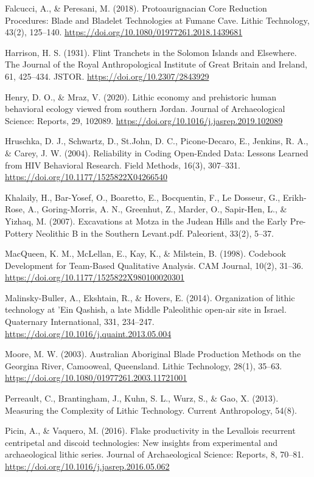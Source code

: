 \documentclass[
]{article}
\begin{document}
Falcucci, A., \& Peresani, M. (2018). Protoaurignacian Core Reduction
Procedures: Blade and Bladelet Technologies at Fumane Cave. Lithic
Technology, 43(2), 125--140.
\url{https://doi.org/10.1080/01977261.2018.1439681}

Harrison, H. S. (1931). Flint Tranchets in the Solomon Islands and
Elsewhere. The Journal of the Royal Anthropological Institute of Great
Britain and Ireland, 61, 425--434. JSTOR.
\url{https://doi.org/10.2307/2843929}

Henry, D. O., \& Mraz, V. (2020). Lithic economy and prehistoric human
behavioral ecology viewed from southern Jordan. Journal of
Archaeological Science: Reports, 29, 102089.
\url{https://doi.org/10.1016/j.jasrep.2019.102089}

Hruschka, D. J., Schwartz, D., St.John, D. C., Picone-Decaro, E.,
Jenkins, R. A., \& Carey, J. W. (2004). Reliability in Coding Open-Ended
Data: Lessons Learned from HIV Behavioral Research. Field Methods,
16(3), 307--331. \url{https://doi.org/10.1177/1525822X04266540}

Khalaily, H., Bar-Yosef, O., Boaretto, E., Bocquentin, F., Le Dosseur,
G., Erikh-Rose, A., Goring-Morris, A. N., Greenhut, Z., Marder, O.,
Sapir-Hen, L., \& Yizhaq, M. (2007). Excavations at Motza in the Judean
Hills and the Early Pre-Pottery Neolithic B in the Southern Levant.pdf.
Paleorient, 33(2), 5--37.

MacQueen, K. M., McLellan, E., Kay, K., \& Milstein, B. (1998). Codebook
Development for Team-Based Qualitative Analysis. CAM Journal, 10(2),
31--36. \url{https://doi.org/10.1177/1525822X980100020301}

Malinsky-Buller, A., Ekshtain, R., \& Hovers, E. (2014). Organization of
lithic technology at 'Ein Qashish, a late Middle Paleolithic open-air
site in Israel. Quaternary International, 331, 234--247.
\url{https://doi.org/10.1016/j.quaint.2013.05.004}

Moore, M. W. (2003). Australian Aboriginal Blade Production Methods on
the Georgina River, Camooweal, Queensland. Lithic Technology, 28(1),
35--63. \url{https://doi.org/10.1080/01977261.2003.11721001}

Perreault, C., Brantingham, J., Kuhn, S. L., Wurz, S., \& Gao, X.
(2013). Measuring the Complexity of Lithic Technology. Current
Anthropology, 54(8).

Picin, A., \& Vaquero, M. (2016). Flake productivity in the Levallois
recurrent centripetal and discoid technologies: New insights from
experimental and archaeological lithic series. Journal of Archaeological
Science: Reports, 8, 70--81.
\url{https://doi.org/10.1016/j.jasrep.2016.05.062}
\end{document}

